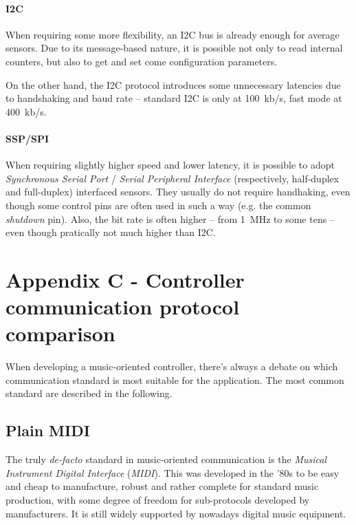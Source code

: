 \documentclass[a4paper,10pt]{article}
\begin{document}
\begin{multicols}{2}
\paragraph{I2C}
When requiring some more flexibility, an I2C bus is already enough for average
sensors. Due to its message-based nature, it is possible not only to read
internal counters, but also to get and set come configuration parameters.

On the other hand, the I2C protocol introduces some unnecessary latencies
due to handshaking and baud rate -- standard I2C is only at 100~kb/s, fast
mode at 400~kb/s.

\INSFIG


\paragraph{SSP/SPI}
When requiring slightly higher speed and lower latency, it is possible to
adopt \emph{Synchronous Serial Port} / \emph{Serial Peripheral Interface}
(respectively, half-duplex and full-duplex) interfaced sensors.
They usually do not require handhaking, even though some control pins are
often used in such a way (e.g. the common \emph{shutdown} pin).
Also, the bit rate is often higher -- from 1~MHz to some tens -- even though
pratically not much higher than I2C.

\INSFIG


\section{Appendix C - Controller communication protocol comparison}

When developing a music-oriented controller, there's always a debate on which
communication standard is most suitable for the application. The most common
standard are described in the following.


\subsection{Plain MIDI}

The truly \emph{de-facto} standard in music-oriented communication is the
\emph{Musical Instrument Digital Interface} (\emph{MIDI}). This was
developed in the '80s to be easy and cheap to manufacture, robust and rather
complete for standard music production, with some degree of freedom for
sub-protocols developed by manufacturers. It is still widely supported by
nowadays digital music equipment.


\end{multicols}
\end{document}
